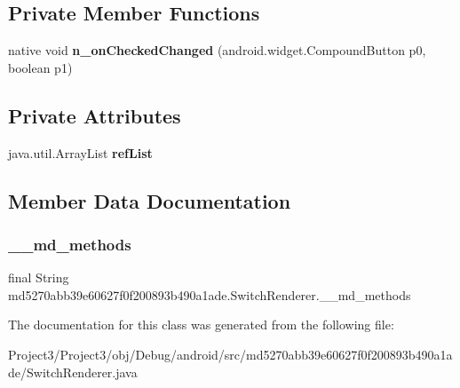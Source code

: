 \subsection*{Private Member Functions}
\begin{DoxyCompactItemize}
\item 
\mbox{\label{classmd5270abb39e60627f0f200893b490a1ade_1_1SwitchRenderer_ad23030fbecb761ed1f07b9bbedb69913}} 
native void {\bfseries n\+\_\+on\+Checked\+Changed} (android.\+widget.\+Compound\+Button p0, boolean p1)
\end{DoxyCompactItemize}
\subsection*{Private Attributes}
\begin{DoxyCompactItemize}
\item 
\mbox{\label{classmd5270abb39e60627f0f200893b490a1ade_1_1SwitchRenderer_aa9fe52d28f98ed4682e97e2a914a77b5}} 
java.\+util.\+Array\+List {\bfseries ref\+List}
\end{DoxyCompactItemize}


\subsection{Member Data Documentation}
\mbox{\label{classmd5270abb39e60627f0f200893b490a1ade_1_1SwitchRenderer_a70baf7daa85c86b196cc9c27e5478a8c}} 
\subsubsection{\texorpdfstring{\+\_\+\+\_\+md\+\_\+methods}{\_\_md\_methods}}
{\footnotesize\ttfamily final String md5270abb39e60627f0f200893b490a1ade.\+Switch\+Renderer.\+\_\+\+\_\+md\+\_\+methods\hspace{0.3cm}{\ttfamily [static]}}



The documentation for this class was generated from the following file\+:\begin{DoxyCompactItemize}
\item 
Project3/\+Project3/obj/\+Debug/android/src/md5270abb39e60627f0f200893b490a1ade/Switch\+Renderer.\+java\end{DoxyCompactItemize}

